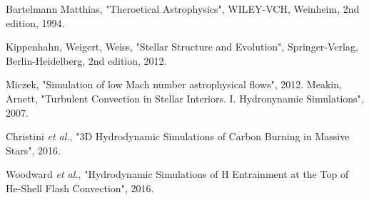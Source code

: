 

\begin{thebibliography}{9}

		  Bartelmann Matthias,
		  "Theroetical Astrophysics",
		      WILEY-VCH, Weinheim,
		        2nd edition,
			  1994.
	
		  Kippenhahn, Weigert, Weiss,
		  "Stellar Structure and Evolution",
		      Springer-Verlag, Berlin-Heidelberg,
		        2nd edition,
			  2012.

		Miczek,
		  "Simulation of low Mach number astrophysical flows",
			  2012.
		  Meakin, Arnett,
		  "Turbulent Convection in Stellar Interiors. I. Hydronynamic Simulations",
			  2007.

		Christini \emph{et al.},
		  "3D Hydrodynamic Simulations of Carbon Burning in Massive Stars",
			  2016.

		Woodward \emph{et al.},
		  "Hydrodynamic Simulations of H Entrainment at the Top of He-Shell Flash Convection",
			  2016.
\end{thebibliography}
